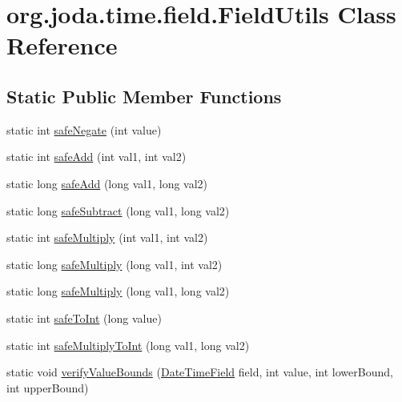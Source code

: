 \hypertarget{classorg_1_1joda_1_1time_1_1field_1_1_field_utils}{\section{org.\-joda.\-time.\-field.\-Field\-Utils Class Reference}
\label{classorg_1_1joda_1_1time_1_1field_1_1_field_utils}
}
\subsection*{Static Public Member Functions}
\begin{DoxyCompactItemize}
\item 
static int \hyperlink{classorg_1_1joda_1_1time_1_1field_1_1_field_utils_a705c83804744557c5c05f09b93944fc3}{safe\-Negate} (int value)
\item 
static int \hyperlink{classorg_1_1joda_1_1time_1_1field_1_1_field_utils_a46be905ceb58fa034d39f8a987188f0b}{safe\-Add} (int val1, int val2)
\item 
static long \hyperlink{classorg_1_1joda_1_1time_1_1field_1_1_field_utils_a4d8c52538ca2288c8d34f8b5a3ad2181}{safe\-Add} (long val1, long val2)
\item 
static long \hyperlink{classorg_1_1joda_1_1time_1_1field_1_1_field_utils_ace9e5f9870a74af25800dff49c52fa28}{safe\-Subtract} (long val1, long val2)
\item 
static int \hyperlink{classorg_1_1joda_1_1time_1_1field_1_1_field_utils_a4de4df2d9b5b18890ad2fe20f6de7963}{safe\-Multiply} (int val1, int val2)
\item 
static long \hyperlink{classorg_1_1joda_1_1time_1_1field_1_1_field_utils_a758dd39bf99c80b7cc2ece30a2709b39}{safe\-Multiply} (long val1, int val2)
\item 
static long \hyperlink{classorg_1_1joda_1_1time_1_1field_1_1_field_utils_ae8b0034f2a4160571b8066c99cca2c95}{safe\-Multiply} (long val1, long val2)
\item 
static int \hyperlink{classorg_1_1joda_1_1time_1_1field_1_1_field_utils_adc00a918d6178df5e3ac854e6d3dbb0c}{safe\-To\-Int} (long value)
\item 
static int \hyperlink{classorg_1_1joda_1_1time_1_1field_1_1_field_utils_af64db544210df61407b188ac5e01cd02}{safe\-Multiply\-To\-Int} (long val1, long val2)
\item 
static void \hyperlink{classorg_1_1joda_1_1time_1_1field_1_1_field_utils_a7b8378a99aad6a706bc27624713b4625}{verify\-Value\-Bounds} (\hyperlink{classorg_1_1joda_1_1time_1_1_date_time_field}{Date\-Time\-Field} field, int value, int lower\-Bound, int upper\-Bound)

\end{DoxyCompactItemize}
